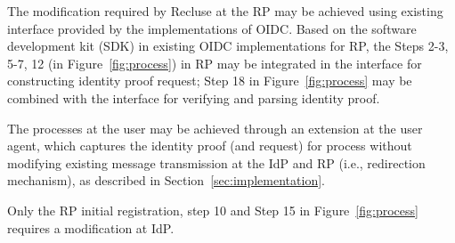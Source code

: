 The modification required by Recluse at the RP may be achieved using existing interface provided by the implementations of OIDC. Based on the software development kit (SDK) in existing OIDC implementations for RP, the Steps 2-3, 5-7, 12 (in Figure~\ref{fig:process}) in RP may be integrated in the interface for constructing identity proof request;
Step 18 in Figure~\ref{fig:process} may be combined with the interface for verifying and parsing identity proof.

The processes at the user may be achieved through an extension at the user agent, which captures the identity proof (and request) for process  without modifying existing message transmission at the IdP and RP (i.e., redirection mechanism), as described in Section~\ref{sec:implementation}.


Only the RP initial registration, step 10 and Step 15 in Figure~\ref{fig:process} requires a modification at IdP.

